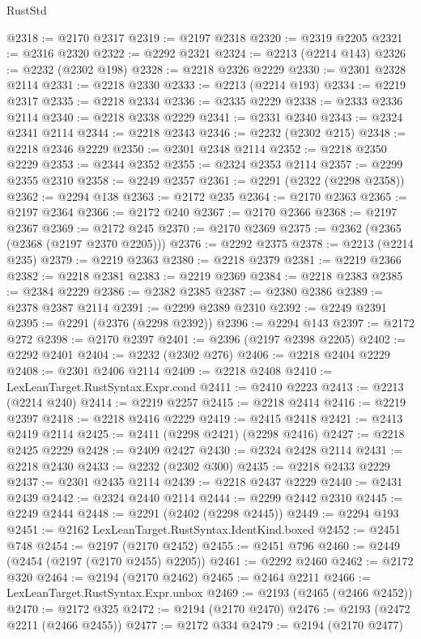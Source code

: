 \begin{lexlean}{RustStd}
\begin{coremodule}
@2318 := @2170 @2317
@2319 := @2197 @2318
@2320 := @2319 @2205
@2321 := @2316 @2320
@2322 := @2292 @2321
@2324 := @2213 (@2214 @143)
@2326 := @2232 (@2302 @198)
@2328 := @2218 @2326 @2229
@2330 := @2301 @2328 @2114
@2331 := @2218 @2330
@2333 := @2213 (@2214 @193)
@2334 := @2219 @2317
@2335 := @2218 @2334
@2336 := @2335 @2229
@2338 := @2333 @2336 @2114
@2340 := @2218 @2338 @2229
@2341 := @2331 @2340
@2343 := @2324 @2341 @2114
@2344 := @2218 @2343
@2346 := @2232 (@2302 @215)
@2348 := @2218 @2346 @2229
@2350 := @2301 @2348 @2114
@2352 := @2218 @2350 @2229
@2353 := @2344 @2352
@2355 := @2324 @2353 @2114
@2357 := @2299 @2355 @2310
@2358 := @2249 @2357
@2361 := @2291 (@2322 (@2298 @2358))
@2362 := @2294 @138
@2363 := @2172 @235
@2364 := @2170 @2363
@2365 := @2197 @2364
@2366 := @2172 @240
@2367 := @2170 @2366
@2368 := @2197 @2367
@2369 := @2172 @245
@2370 := @2170 @2369
@2375 := @2362 (@2365 (@2368 (@2197 @2370 @2205)))
@2376 := @2292 @2375
@2378 := @2213 (@2214 @235)
@2379 := @2219 @2363
@2380 := @2218 @2379
@2381 := @2219 @2366
@2382 := @2218 @2381
@2383 := @2219 @2369
@2384 := @2218 @2383
@2385 := @2384 @2229
@2386 := @2382 @2385
@2387 := @2380 @2386
@2389 := @2378 @2387 @2114
@2391 := @2299 @2389 @2310
@2392 := @2249 @2391
@2395 := @2291 (@2376 (@2298 @2392))
@2396 := @2294 @143
@2397 := @2172 @272
@2398 := @2170 @2397
@2401 := @2396 (@2197 @2398 @2205)
@2402 := @2292 @2401
@2404 := @2232 (@2302 @276)
@2406 := @2218 @2404 @2229
@2408 := @2301 @2406 @2114
@2409 := @2218 @2408
@2410 := LexLeanTarget.RustSyntax.Expr.cond
@2411 := @2410 @2223
@2413 := @2213 (@2214 @240)
@2414 := @2219 @2257
@2415 := @2218 @2414
@2416 := @2219 @2397
@2418 := @2218 @2416 @2229
@2419 := @2415 @2418
@2421 := @2413 @2419 @2114
@2425 := @2411 (@2298 @2421) (@2298 @2416)
@2427 := @2218 @2425 @2229
@2428 := @2409 @2427
@2430 := @2324 @2428 @2114
@2431 := @2218 @2430
@2433 := @2232 (@2302 @300)
@2435 := @2218 @2433 @2229
@2437 := @2301 @2435 @2114
@2439 := @2218 @2437 @2229
@2440 := @2431 @2439
@2442 := @2324 @2440 @2114
@2444 := @2299 @2442 @2310
@2445 := @2249 @2444
@2448 := @2291 (@2402 (@2298 @2445))
@2449 := @2294 @193
@2451 := @2162 LexLeanTarget.RustSyntax.IdentKind.boxed
@2452 := @2451 @748
@2454 := @2197 (@2170 @2452)
@2455 := @2451 @796
@2460 := @2449 (@2454 (@2197 (@2170 @2455) @2205))
@2461 := @2292 @2460
@2462 := @2172 @320
@2464 := @2194 (@2170 @2462)
@2465 := @2464 @2211
@2466 := LexLeanTarget.RustSyntax.Expr.unbox
@2469 := @2193 (@2465 (@2466 @2452))
@2470 := @2172 @325
@2472 := @2194 (@2170 @2470)
@2476 := @2193 (@2472 @2211 (@2466 @2455))
@2477 := @2172 @334
@2479 := @2194 (@2170 @2477)

\end{coremodule}
\end{lexlean}

